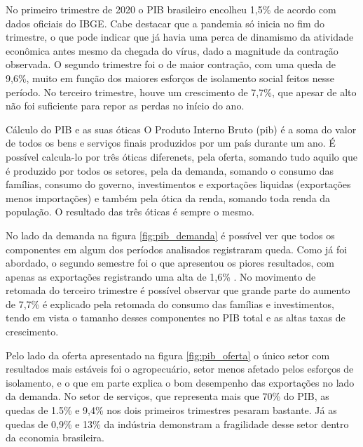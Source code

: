 \par No primeiro trimestre de 2020 o PIB brasileiro encolheu 1,5\% de acordo com dados oficiais do IBGE. Cabe destacar que a pandemia só inicia no fim do trimestre, o que pode indicar que já havia uma perca de dinamismo da atividade econômica antes mesmo da chegada do vírus, dado a magnitude da contração observada. O segundo trimestre foi o de maior contração, com uma queda de 9,6\%, muito em função dos maiores esforços de isolamento social feitos nesse período. No terceiro trimestre, houve um crescimento de 7,7\%, que apesar de alto não foi suficiente para repor as perdas no início do ano.
\begin{smbox}[label={labelbox},nameref={Cálculo do PIB e as suas óticas}]{Cálculo do PIB e as suas óticas}
	O Produto Interno Bruto (\acrshort{pib}) é a soma do valor de todos os bens e serviços finais produzidos por um país durante um ano. É possível calcula-lo por três óticas diferenets, pela oferta, somando tudo aquilo que é produzido por todos os setores, pela da demanda, somando o consumo das famílias, consumo do governo, investimentos e exportações liquidas (exportações menos importações) e também pela ótica da renda, somando toda renda da população. O resultado das três óticas é sempre o mesmo.
\end{smbox} 
\par No lado da demanda na figura \ref{fig:pib_demanda} é possível ver que todos os componentes em algum dos períodos analisados registraram queda. Como já foi abordado, o segundo semestre foi o que apresentou os piores resultados, com apenas as exportações registrando uma alta de 1,6\% . No movimento de retomada do terceiro trimestre é possível observar que grande parte do aumento de 7,7\% é explicado pela retomada do consumo das famílias e investimentos, tendo em vista o tamanho desses componentes no PIB total e as altas taxas de crescimento.
\par Pelo lado da oferta apresentado na figura \ref{fig:pib_oferta} o único setor com resultados mais estáveis foi o agropecuário, setor menos afetado pelos esforços de isolamento, e o que em parte explica o bom desempenho das exportações no lado da demanda. No setor de serviços, que representa mais que 70\% do PIB, as quedas de 1.5\% e 9,4\% nos dois primeiros trimestres pesaram bastante. Já as quedas de 0,9\% e 13\% da indústria demonstram a fragilidade desse setor dentro da economia brasileira.
